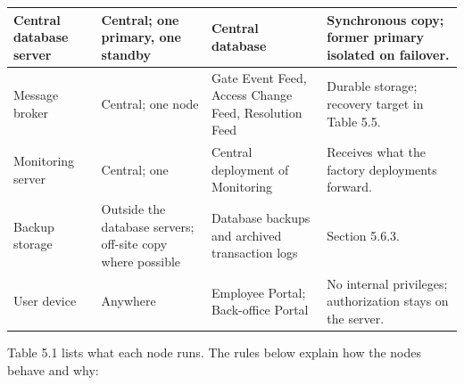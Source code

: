\begin{longtable}{|>{\raggedright\arraybackslash}p{88pt}|>{\raggedright\arraybackslash}p{82pt}|>{\raggedright\arraybackslash}p{128pt}|>{\raggedright\arraybackslash}p{108pt}|}
\hline
Central database server & Central; one primary, one standby & Central database & Synchronous copy; former primary isolated on failover. \\
\hline
Message broker & Central; one node & Gate Event Feed, Access Change Feed, Resolution Feed & Durable storage; recovery target in Table 5.5. \\
\hline
Monitoring server & Central; one & Central deployment of Monitoring & Receives what the factory deployments forward. \\
\hline
Backup storage & Outside the database servers; off-site copy where possible & Database backups and archived transaction logs & Section 5.6.3. \\*
\hline\noalign{\nobreak}
User device & Anywhere & Employee Portal; Back-office Portal & No internal privileges; authorization stays on the server. \\
\hline
\end{longtable}


Table 5.1 lists what each node runs. The rules below explain how the nodes behave and why:

